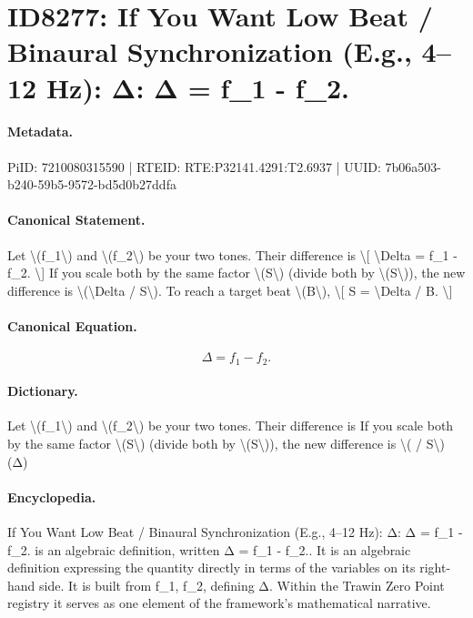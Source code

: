 \section*{ID8277: If You Want Low Beat / Binaural Synchronization (E.g., 4–12 Hz): Δ: Δ = f\_1 - f\_2.}
\paragraph{Metadata.}
PiID: 7210080315590 | RTEID: RTE:P32141.4291:T2.6937 | UUID: 7b06a503-b240-59b5-9572-bd5d0b27ddfa

\paragraph{Canonical Statement.}
Let \textbackslash{}(f\_1\textbackslash{}) and \textbackslash{}(f\_2\textbackslash{}) be your two tones. Their difference is \textbackslash{}[ \textbackslash{}Delta = f\_1 - f\_2. \textbackslash{}] If you scale both by the same factor \textbackslash{}(S\textbackslash{}) (divide both by \textbackslash{}(S\textbackslash{})), the new difference is \textbackslash{}(\textbackslash{}Delta / S\textbackslash{}). To reach a target beat \textbackslash{}(B\textbackslash{}), \textbackslash{}[ S = \textbackslash{}Delta / B. \textbackslash{}]

\paragraph{Canonical Equation.}
\[
\Delta = f_1 - f_2.
\]

\paragraph{Dictionary.}
Let \textbackslash{}(f\_1\textbackslash{}) and \textbackslash{}(f\_2\textbackslash{}) be your two tones. Their difference is If you scale both by the same factor \textbackslash{}(S\textbackslash{}) (divide both by \textbackslash{}(S\textbackslash{})), the new difference is \textbackslash{}( / S\textbackslash{}) (Δ)

\paragraph{Encyclopedia.}
If You Want Low Beat / Binaural Synchronization (E.g., 4–12 Hz): Δ: Δ = f\_1 - f\_2. is an algebraic definition, written Δ = f\_1 - f\_2.. It is an algebraic definition expressing the quantity directly in terms of the variables on its right-hand side. It is built from f\_1, f\_2, defining Δ. Within the Trawin Zero Point registry it serves as one element of the framework's mathematical narrative.
